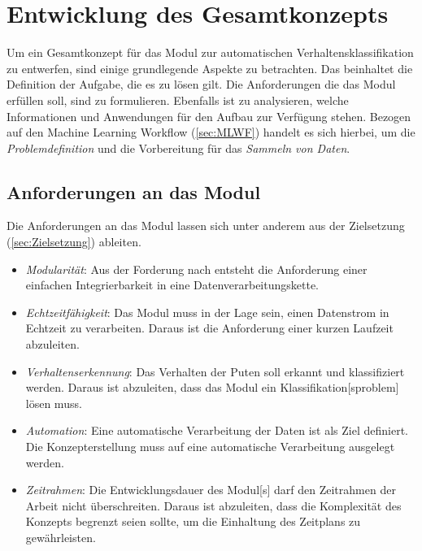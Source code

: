 \section{Entwicklung des Gesamtkonzepts} \label{sec:Meth gesamtkonzept}
Um ein Gesamtkonzept für das \gls{Modul} zur automatischen Verhaltensklassifikation zu entwerfen, sind einige grundlegende Aspekte zu betrachten. Das beinhaltet die Definition der Aufgabe, die es zu lösen gilt. Die Anforderungen die das \gls{Modul} erfüllen soll, sind zu formulieren. Ebenfalls ist zu analysieren, welche Informationen und Anwendungen für den Aufbau zur Verfügung stehen. Bezogen auf den \gls{Machine Learning Workflow} (\autoref{sec:MLWF}) handelt es sich hierbei, um die \textit{Problemdefinition} und die Vorbereitung für das \textit{Sammeln von Daten}. \par

\subsection{Anforderungen an das Modul} \label{sec:Meth Anforderungen}

Die Anforderungen an das \gls{Modul} lassen sich unter anderem aus der Zielsetzung (\autoref{sec:Zielsetzung}) ableiten. 

\begin{itemize}
    \item \textit{Modularität}: Aus der Forderung nach  entsteht die Anforderung einer einfachen Integrierbarkeit in eine Datenverarbeitungskette.
    \item \textit{Echtzeitfähigkeit}: Das \gls{Modul} muss in der Lage sein, einen Datenstrom in Echtzeit zu verarbeiten. Daraus ist die Anforderung einer kurzen Laufzeit abzuleiten.
    \item \textit{Verhaltenserkennung}: Das Verhalten der Puten soll erkannt und klassifiziert werden. Daraus ist abzuleiten, dass das \gls{Modul} ein \gls{Klassifikation}[sproblem] lösen muss.
    \item \textit{Automation}: Eine automatische Verarbeitung der Daten ist als Ziel definiert. Die Konzepterstellung muss auf eine automatische Verarbeitung ausgelegt werden. 
    \item \textit{Zeitrahmen}: Die Entwicklungsdauer des \gls{Modul}[s] darf den Zeitrahmen der Arbeit nicht überschreiten. Daraus ist abzuleiten, dass die Komplexität des Konzepts begrenzt seien sollte, um die Einhaltung des Zeitplans zu gewährleisten.
\end{itemize}


